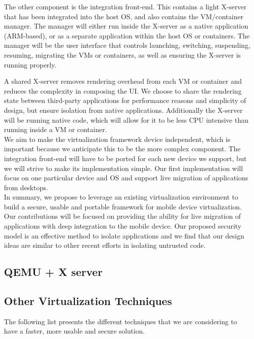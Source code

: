 The other component is the integration front-end.  This contains a light X-server that has been integrated into the host OS, and also contains the VM/container manager.  The manager will either run inside the X-server as a native application (ARM-based), or as a separate application within the host OS or containers.  The manager will be the user interface that controls launching, switching, suspending, resuming, migrating the VMs or containers, as well as ensuring the X-server is running properly. %

A shared X-server removes rendering overhead from each VM or container and reduces the complexity in composing the UI. We choose to share the rendering state between third-party applications for performance reasons and simplicity of design, but ensure isolation from native applications.  Additionally the X-server will be running native code, which will allow for it to be less CPU intensive than running inside a VM or container. \\

We aim to make the virtualization framework device independent, which is important because we anticipate this to be the more complex component.  The integration front-end will have to be ported for each new device we support, but we will strive to make its implementation simple. Our first implementation will focus on one particular device and OS and support live migration of applications from desktops. \\

In summary, we propose to leverage an existing virtualization environment to build a secure, usable and portable framework for mobile device virtualization. Our contributions will be focused on providing the ability for live migration of applications with deep integration to the mobile device. Our proposed security model is an effective method to isolate applications and we find that our design ideas are similar to other recent efforts \cite{grier2008secure} in isolating untrusted code.

\subsection{QEMU + X server}
\subsection{Other Virtualization Techniques}
The following list presents the different techniques that we are considering to have a faster, more usable and secure solution.
